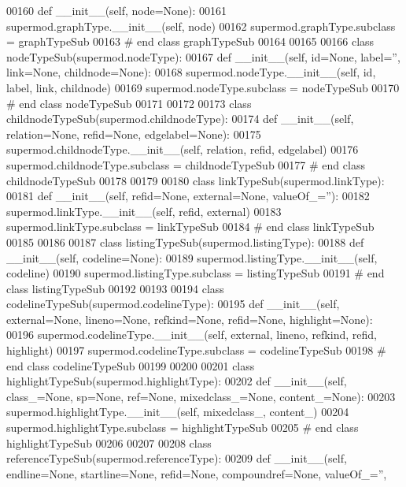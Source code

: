 \begin{DoxyCode}
00160     \textcolor{keyword}{def }__init__(self, node=None):
00161         supermod.graphType.\_\_init\_\_(self, node)
00162 supermod.graphType.subclass = graphTypeSub
00163 \textcolor{comment}{# end class graphTypeSub}
00164 
00165 
00166 \textcolor{keyword}{class }nodeTypeSub(supermod.nodeType):
00167     \textcolor{keyword}{def }__init__(self, id=None, label='', link=None, childnode=None):
00168         supermod.nodeType.\_\_init\_\_(self, id, label, link, childnode)
00169 supermod.nodeType.subclass = nodeTypeSub
00170 \textcolor{comment}{# end class nodeTypeSub}
00171 
00172 
00173 \textcolor{keyword}{class }childnodeTypeSub(supermod.childnodeType):
00174     \textcolor{keyword}{def }__init__(self, relation=None, refid=None, edgelabel=None):
00175         supermod.childnodeType.\_\_init\_\_(self, relation, refid, edgelabel)
00176 supermod.childnodeType.subclass = childnodeTypeSub
00177 \textcolor{comment}{# end class childnodeTypeSub}
00178 
00179 
00180 \textcolor{keyword}{class }linkTypeSub(supermod.linkType):
00181     \textcolor{keyword}{def }__init__(self, refid=None, external=None, valueOf\_=''):
00182         supermod.linkType.\_\_init\_\_(self, refid, external)
00183 supermod.linkType.subclass = linkTypeSub
00184 \textcolor{comment}{# end class linkTypeSub}
00185 
00186 
00187 \textcolor{keyword}{class }listingTypeSub(supermod.listingType):
00188     \textcolor{keyword}{def }__init__(self, codeline=None):
00189         supermod.listingType.\_\_init\_\_(self, codeline)
00190 supermod.listingType.subclass = listingTypeSub
00191 \textcolor{comment}{# end class listingTypeSub}
00192 
00193 
00194 \textcolor{keyword}{class }codelineTypeSub(supermod.codelineType):
00195     \textcolor{keyword}{def }__init__(self, external=None, lineno=None, refkind=None, refid=None, highlight=None):
00196         supermod.codelineType.\_\_init\_\_(self, external, lineno, refkind, refid, highlight)
00197 supermod.codelineType.subclass = codelineTypeSub
00198 \textcolor{comment}{# end class codelineTypeSub}
00199 
00200 
00201 \textcolor{keyword}{class }highlightTypeSub(supermod.highlightType):
00202     \textcolor{keyword}{def }__init__(self, class\_=None, sp=None, ref=None, mixedclass\_=None, content\_=None):
00203         supermod.highlightType.\_\_init\_\_(self, mixedclass\_, content\_)
00204 supermod.highlightType.subclass = highlightTypeSub
00205 \textcolor{comment}{# end class highlightTypeSub}
00206 
00207 
00208 \textcolor{keyword}{class }referenceTypeSub(supermod.referenceType):
00209     \textcolor{keyword}{def }__init__(self, endline=None, startline=None, refid=None, compoundref=None, valueOf\_='', 

\end{DoxyCode}
